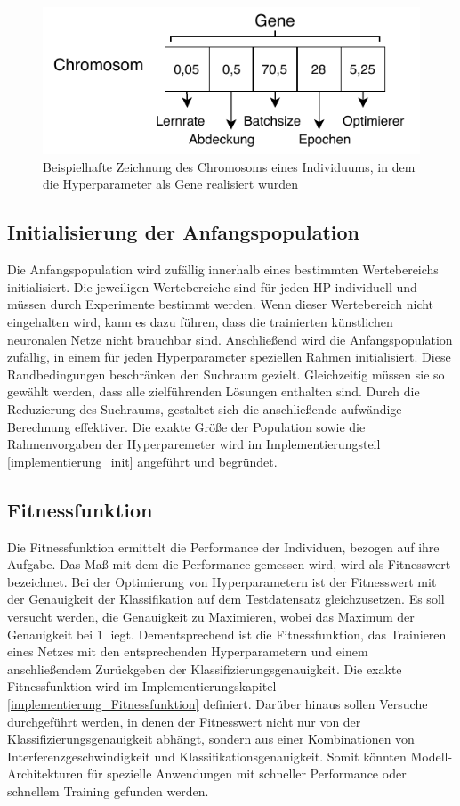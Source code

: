 \begin{figure}[H]
  \centering  
  \includegraphics[scale=1.3]{img/gene_hyperparameter.pdf}
  \caption{Beispielhafte Zeichnung des Chromosoms eines Individuums, in dem die Hyperparameter als Gene realisiert wurden}
  \label{fig:gene_hyperparameter}
\end{figure}

\subsection{Initialisierung der Anfangspopulation}
Die Anfangspopulation wird zufällig innerhalb eines bestimmten Wertebereichs initialisiert. Die jeweiligen Wertebereiche sind für jeden HP individuell und müssen durch Experimente bestimmt werden. Wenn dieser Wertebereich nicht eingehalten wird, kann es dazu führen, dass die trainierten künstlichen neuronalen Netze nicht brauchbar sind. Anschließend wird die Anfangspopulation zufällig, in einem für jeden Hyperparameter speziellen Rahmen initialisiert. Diese Randbedingungen beschränken den Suchraum gezielt. Gleichzeitig müssen sie so gewählt werden, dass alle zielführenden Lösungen enthalten sind. Durch die Reduzierung des Suchraums, gestaltet sich die anschließende aufwändige Berechnung effektiver. Die exakte Größe der Population sowie die Rahmenvorgaben der Hyperparemeter wird im Implementierungsteil \ref{implementierung_init} angeführt und begründet.

\subsection{Fitnessfunktion}
Die Fitnessfunktion ermittelt die Performance der Individuen, bezogen auf ihre Aufgabe. Das Maß mit dem die Performance gemessen wird, wird als Fitnesswert bezeichnet. Bei der Optimierung von Hyperparametern ist der Fitnesswert mit der Genauigkeit der Klassifikation auf dem Testdatensatz gleichzusetzen. Es soll versucht werden, die Genauigkeit zu Maximieren, wobei das Maximum der Genauigkeit bei 1 liegt. Dementsprechend ist die Fitnessfunktion, das Trainieren eines Netzes mit den entsprechenden Hyperparametern und einem anschließendem Zurückgeben der Klassifizierungsgenauigkeit. Die exakte Fitnessfunktion wird im Implementierungskapitel \ref{implementierung_Fitnessfunktion} definiert. Darüber hinaus sollen Versuche durchgeführt werden, in denen der Fitnesswert nicht nur von der Klassifizierungsgenauigkeit abhängt, sondern aus einer Kombinationen von Interferenzgeschwindigkeit und Klassifikationsgenauigkeit. Somit könnten Modell-Architekturen für spezielle Anwendungen mit schneller Performance oder schnellem Training gefunden werden.

